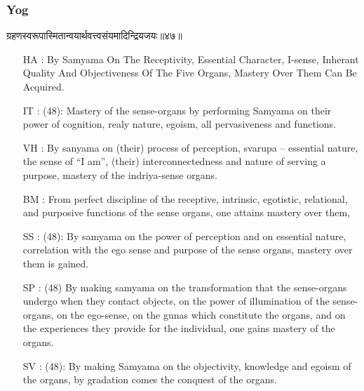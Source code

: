 \begin{frame}[fragile]\frametitle{Yog}
\begin{sanskrit}
ग्रहणस्वरूपास्मितान्वयार्थवत्त्वसंयमादिन्द्रियजयः॥४७॥
\end{sanskrit}
	\begin{itemize}
	\item [HA]: By Samyama On The Receptivity, Essential Character, I-sense, Inherant Quality And Objectiveness Of The Five Organs, Mastery Over Them Can Be Acquired.
	\item [IT]: (48): Mastery of the sense-organs by performing Samyama on their power of cognition, realy nature, egoism, all pervasiveness and functions.
	\item [VH]: By sanyama on (their) process of perception, svarupa – essential nature, the sense of “I am”, (their) interconnectedness and nature of serving a purpose, mastery of the indriya-sense organs.
	\item [BM]: From perfect discipline of the receptive, intrinsic, egotistic, relational, and purposive functions of the sense organs, one attains mastery over them,
	\item [SS]: (48): By samyama on the power of perception and on essential nature, correlation with the ego sense and purpose of the sense organs, mastery over them is gained.
	\item [SP]: (48) By making samyama on the transformation that the sense-organs undergo when they contact objects, on the power of illumination of the sense-organs, on the ego-sense, on the gunas which constitute the organs, and on the experiences they provide for the individual, one gains mastery of the organs.
	\item [SV]: (48): By making Samyama on the objectivity, knowledge and egoism of the organs, by gradation comes the conquest of the organs. 
	\end{itemize}
\end{frame}



